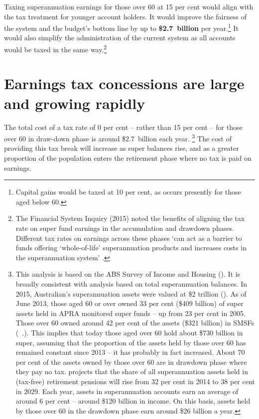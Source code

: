 Taxing superannuation earnings for those over 60 at 15 per cent would align with the tax treatment for younger account holders. It would improve the fairness of the system and the budget’s bottom line by up to \textbf{\$2.7~billion} per year.\footnote{Capital gains would be taxed at 10 per cent, as occurs presently for those aged below 60.}  It would also simplify the administration of the current system as all accounts would be taxed in the same way.\footnote{The \textcite[][140]{FinancialSystemsInquiry2015} Financial System Inquiry (2015) noted the benefits of aligning the tax rate on super fund earnings in the accumulation and drawdown phases. Different tax rates on earnings across these phases ‘can act as a barrier to funds offering ‘whole-of-life’ superannuation products and increases costs in the superannuation system’ \textcite[][140]{FinancialSystemsInquiry2015}. } 

%
\oneraggedpage
\section{Earnings tax concessions are large and growing rapidly}\label{sec:SUPER-6-1}
The total cost of a tax rate of 0 per cent – rather than 15 per cent – for those over 60 in draw-down phase is around \$2.7~billion each year.%
\footnote{This analysis is based on the ABS Survey of Income and Housing (\textcite{ABS2015-Survey-of-income-and-housing-2013-14}). It is broadly consistent with analysis based on total superannuation balances. In 2015, Australian’s superannuation assets were valued at \$2 trillion (\textcites[][6]{APRA2015JuneSuperPerformance}[][7]{MinifieSavageCameron2015}). As of June 2013, those aged 60 or over owned 33 per cent (\$409 billion) of super assets held in APRA monitored super funds – up from 23 per cent in 2005. Those over 60 owned around 42 per cent of the assets (\$321 billion) in SMSFs (\gao\ \textcite{ATO2014e}.). This implies that today those aged over 60 hold about \$730 billion in super, assuming that the proportion of the assets held by those over 60 has remained constant since 2013 – it has probably in fact increased. About 70 per cent of the assets owned by those over 60 are in drawdown phase where they pay no tax. \textcite[][23]{RiceWarner2015SubmissionTaxWhitePaper} projects that the share of all superannuation assets held in (tax-free) retirement pensions will rise from 32 per cent in 2014 to 38 per cent in 2029. Each year, assets in superannuation accounts earn an average of around 6 per cent – around \$120 billion in income. On this basis, assets held by those over 60 in the drawdown phase earn around \$26 billion a year.}  The cost of providing this tax break will increase as super balances rise, and as a greater proportion of the population enters the retirement phase where no tax is paid on earnings. 

